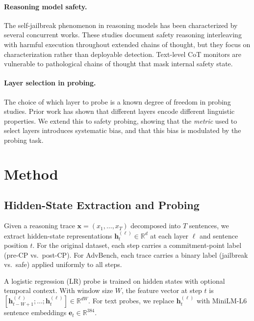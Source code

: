 \documentclass[11pt]{article}
\begin{document}
\paragraph{Reasoning model safety.}
The self-jailbreak phenomenon in reasoning models has been characterized by several concurrent works. These studies document safety reasoning interleaving with harmful execution throughout extended chains of thought, but they focus on characterization rather than deployable detection. Text-level CoT monitors are vulnerable to pathological chains of thought that mask internal safety state.

\paragraph{Layer selection in probing.}
The choice of which layer to probe is a known degree of freedom in probing studies. Prior work has shown that different layers encode different linguistic properties. We extend this to safety probing, showing that the \emph{metric} used to select layers introduces systematic bias, and that this bias is modulated by the probing task.

\section{Method}
\label{sec:method}

\subsection{Hidden-State Extraction and Probing}

Given a reasoning trace $\mathbf{x} = (x_1, \ldots, x_T)$ decomposed into $T$ sentences, we extract hidden-state representations $\mathbf{h}_t^{(\ell)} \in \mathbb{R}^d$ at each layer $\ell$ and sentence position $t$. For the original dataset, each step carries a commitment-point label (pre-CP vs.\ post-CP). For AdvBench, each trace carries a binary label (jailbreak vs.\ safe) applied uniformly to all steps.

A logistic regression (LR) probe is trained on hidden states with optional temporal context. With window size $W$, the feature vector at step $t$ is $[\mathbf{h}_{t-W+1}^{(\ell)}; \ldots; \mathbf{h}_t^{(\ell)}] \in \mathbb{R}^{dW}$. For text probes, we replace $\mathbf{h}_t^{(\ell)}$ with MiniLM-L6 sentence embeddings $\mathbf{e}_t \in \mathbb{R}^{384}$.
\end{document}
